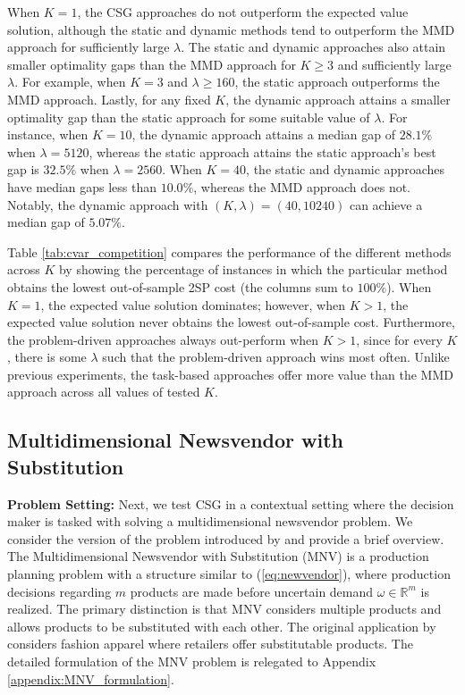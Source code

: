 When $K = 1$, the CSG approaches do not outperform the expected value solution, although the static and dynamic methods tend to outperform the MMD approach for sufficiently large $\lambda$. The static and dynamic approaches also attain smaller optimality gaps than the MMD approach for $K \geq 3$ and sufficiently large $\lambda$. For example, when $K = 3$ and $\lambda \geq 160$, the static approach outperforms the MMD approach. Lastly, for any fixed $K$, the dynamic approach attains a smaller optimality gap than the static approach for some suitable value of $\lambda$. For instance, when $K = 10$, the dynamic approach attains a median gap of $28.1\%$ when $\lambda = 5120$, whereas the static approach attains the static approach's best gap is $32.5\%$ when $\lambda = 2560$. When $K = 40$, the static and dynamic approaches have median gaps less than $10.0\%$, whereas the MMD approach does not. Notably, the dynamic approach with $(K, \lambda)= (40, 10240)$ can achieve a median gap of $5.07\%$.


Table \ref{tab:cvar_competition} compares the performance of the different methods across $K$ by showing the percentage of instances in which the particular method obtains the lowest out-of-sample 2SP cost (the columns sum to $100\%$). When $K=1$, the expected value solution dominates; however, when \hbox{$K > 1$}, the expected value solution never obtains the lowest out-of-sample cost. Furthermore, the problem-driven approaches always out-perform when \hbox{$K > 1$}, since for every $K$, there is some $\lambda$ such that the problem-driven approach wins most often. Unlike previous experiments, the task-based approaches offer more value than the MMD approach across all values of tested $K$. 

\subsection{Multidimensional Newsvendor with Substitution} 

\noindent \textbf{Problem Setting:} Next, we test CSG in a contextual setting where the decision maker is tasked with solving a multidimensional newsvendor problem. We consider the version of the problem introduced by \citet{narum2024problem} and provide a brief overview. The Multidimensional Newsvendor with Substitution (MNV) is a production planning problem with a structure similar to (\ref{eq:newvendor}), where production decisions regarding $m$ products are made before uncertain demand $\omega \in \mathbb{R}^m$ is realized. The primary distinction is that MNV considers multiple products and allows products to be substituted with each other. The original application by \citet{vaagen2011modelling} considers fashion apparel where retailers offer substitutable products. The detailed formulation of the MNV problem is relegated to Appendix \ref{appendix:MNV_formulation}. 



